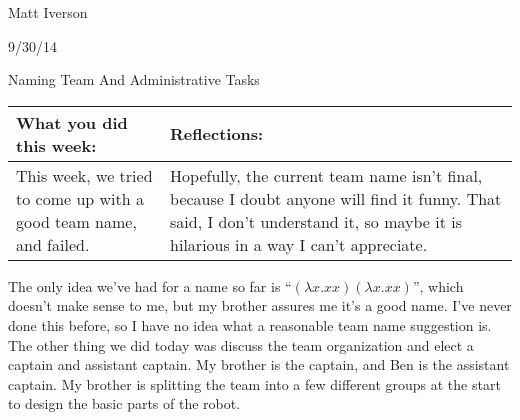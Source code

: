 Matt Iverson

9/30/14

Naming Team And Administrative Tasks

\begin{tabular}{|p{5cm}|p{5cm}|}
 \hline
 What you did this week: &
 Reflections: \\
 \hline
 This week, we tried to come up with a good team name, and failed. &
 Hopefully, the current team name isn’t final, because I doubt anyone will find it funny. That said, I don’t understand it, so maybe it is hilarious in a way I can’t appreciate. \\
 \hline
\end{tabular}

The only idea we’ve had for a name so far is
“$(\lambda x.xx)(\lambda x.xx)$”,
which doesn’t make sense to me, but my brother assures me it’s a good name. I’ve never done this before, so I have no idea what a reasonable team name suggestion is.
	The other thing we did today was discuss the team organization and elect a captain and assistant captain. My brother is the captain, and Ben is the assistant captain. My brother is splitting the team into a few different groups at the start to design the basic parts of the robot.


